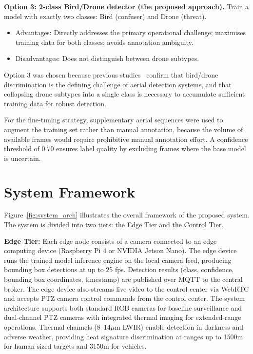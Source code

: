 \documentclass[12pt,a4paper]{report}
\begin{document}
\textbf{Option 3: 2-class Bird/Drone detector (the proposed approach).}
Train a model with exactly two classes: Bird (confuser) and Drone (threat).
\begin{itemize}
  \item Advantages: Directly addresses the primary operational challenge;
        maximises training data for both classes; avoids annotation ambiguity.
  \item Disadvantages: Does not distinguish between drone subtypes.
\end{itemize}

Option 3 was chosen because previous studies~\cite{coluccia2021sensors,munir2023kfupm}
confirm that bird/drone discrimination is the defining challenge of aerial
detection systems, and that collapsing drone subtypes into a single class
is necessary to accumulate sufficient training data for robust detection.

For the fine-tuning strategy, supplementary aerial sequences were used to
augment the training set rather than manual annotation, because the volume
of available frames would require prohibitive manual annotation effort.
A confidence threshold of 0.70 ensures label quality by excluding frames
where the base model is uncertain.

\section{System Framework}

Figure~\ref{fig:system_arch} illustrates the overall framework of the
proposed system. The system is divided into two tiers: the Edge Tier and
the Control Tier.

\textbf{Edge Tier:} Each edge node consists of a camera connected to an
edge computing device (Raspberry Pi 4 or NVIDIA Jetson Nano). The edge
device runs the trained model inference engine on the local camera feed, producing
bounding box detections at up to 25 fps. Detection results (class, confidence,
bounding box coordinates, timestamp) are published over MQTT to the central
broker. The edge device also streams live video to the control center via
WebRTC and accepts PTZ camera control commands from the control center.
The system architecture supports both standard RGB cameras for baseline
surveillance and dual-channel PTZ cameras with integrated thermal imaging
for extended-range operations. Thermal channels (8--14$\mu$m LWIR) enable
detection in darkness and adverse weather, providing heat signature discrimination
at ranges up to 1500m for human-sized targets and 3150m for vehicles.
\end{document}
